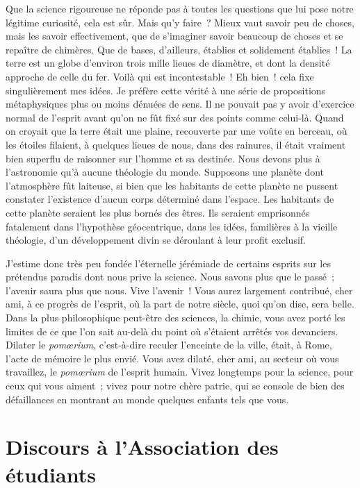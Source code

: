 \documentclass[french,twoside]{book} %
\newcommand\orgName[1]{#1}
\newcommand\placeName[1]{#1}
\begin{document}
Que la science rigoureuse ne réponde pas à toutes les questions que lui pose notre légitime curiosité, cela est sûr. Mais qu’y faire ? Mieux vaut savoir peu de choses, mais les savoir effectivement, que de s’imaginer savoir beaucoup de choses et se repaître de chimères. Que de bases, d’ailleurs, établies et solidement établies ! La terre est un globe d’environ trois mille lieues de diamètre, et dont la densité approche de celle du fer. Voilà qui est incontestable ! Eh bien ! cela fixe singulièrement mes idées. Je préfère cette vérité à une série de propositions métaphysiques plus ou moins dénuées de sens. Il ne pouvait pas y avoir d’exercice normal de l’esprit avant qu’on ne fût fixé sur des points comme celui-là. Quand on croyait que la terre était une plaine, recouverte par une voûte en berceau, où les étoiles filaient, à quelques lieues de nous, dans des rainures, il était vraiment bien superflu de raisonner sur l’homme et sa destinée. Nous devons plus à l’astronomie qu’à aucune théologie du monde. Supposons une planète dont l’atmosphère fût laiteuse, si bien que les habitants de cette planète ne pussent constater l’existence d’aucun corps déterminé dans l’espace. Les habitants de cette planète seraient les plus bornés des êtres. Ils seraient emprisonnés fatalement dans l’hypothèse géocentrique, dans les idées, familières à la vieille théologie, d’un développement divin se déroulant à leur profit exclusif.\par
J’estime donc très peu fondée l’éternelle jérémiade de certains esprits sur les prétendus paradis dont nous prive la science. Nous savons plus que le passé ; l’avenir saura plus que nous. Vive l’avenir ! Vous aurez largement contribué, cher ami, à ce progrès de l’esprit, où la part de notre siècle, quoi qu’on dise, sera belle. Dans la plus philosophique peut-être des sciences, la chimie, vous avez porté les limites de ce que l’on sait au-delà du point où s’étaient arrêtés vos devanciers. Dilater le {\itshape pomœrium}, c’est-à-dire reculer l’enceinte de la ville, était, à {\placeName Rome}, l’acte de mémoire le plus envié. Vous avez dilaté, cher ami, au secteur où vous travaillez, le {\itshape pomœrium} de l’esprit humain. Vivez longtemps pour la science, pour ceux qui vous aiment ; vivez pour notre chère patrie, qui se console de bien des défaillances en montrant au monde quelques enfants tels que vous.
\section[{Discours à l’Association des étudiants}]{Discours à l’{\orgName Association des étudiants}}\renewcommand{\leftmark}{Discours à l’{\orgName Association des étudiants}}
\end{document}
